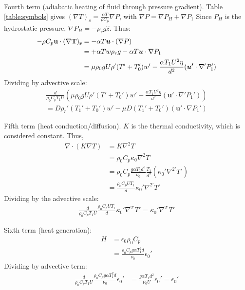 \documentclass[a4paper]{article}
\begin{document}
\begin{mdframed}
    Fourth term (adiabatic heating of fluid through pressure gradient). Table \ref{table:symbols} gives $(\nabla T)_s = \frac{\alpha T}{\rho C_p}\nabla P$, with $\nabla P = \nabla P_H + \nabla P_1$ 
    Since $P_H$ is the hydrostatic pressure, $\nabla P_H = -\rho_r g \hat{z}$. Thus: 
    \begin{align*}
        -\rho C_p \bf{u} \cdot (\nabla T)_s &= -\alpha T \bm{u} \cdot (\nabla P)\\
        &= +\alpha T w \rho_r g - \alpha T \bm{u} \cdot \nabla P_1\\
        &= \mu \rho_0gU\rho'(T'+T_0')w' - \frac{\alpha T_1 U^2 \eta}{d^2} (\bm{u'}\cdot \nabla'P_1') \\
    \end{align*} 
Dividing by advective scale: 
\begin{align*}
    \frac{d}{\rho_0C_p T_1 U} \left(\mu \rho_0gU\rho'(T'+T_0')w' - \frac{\alpha T_1 U^2 \eta}{d^2} (\bm{u'}\cdot \nabla'P_1')\right) \\
    = D \rho_r'(T_1'+T_0')w' - \mu D (T_1'+T_0')(\bm{u'}\cdot\nabla P_1') 
\end{align*}
\end{mdframed}
\begin{mdframed}
    Fifth term (heat conduction/diffusion). $K$ is the thermal conductivity, which is considered constant. Thus, 
    \begin{align*}
        \nabla \cdot (K\nabla T) &= K\nabla^2T\\
        &= \rho_0 C_p \kappa_0  \nabla^2 T\\
        &= \rho_0 C_p \frac{g\alpha T_1 d^3}{\nu_0} \frac{T_1}{d^2} (\kappa_0' \nabla^{2'}T') \\
        &= \frac{\rho_0C_pUT_1}{d}\kappa_0' \nabla^{2'}T'
    \end{align*}
    Dividing by the advective scale: 
    \begin{align*}
        \frac{d}{\rho_0C_p T_1 U} \frac{\rho_0C_pUT_1}{d}\kappa_0' \nabla^{2'}T' = \kappa_0' \nabla^{2'}T' 
    \end{align*}
\end{mdframed}

\begin{mdframed}
    Sixth term (heat generation): 
    \begin{align*}
        H &= \epsilon_0\rho_0C_p\\
        &= \frac{\rho_0C_p g \alpha T_1^2d}{\nu_0}\epsilon_0'
    \end{align*}
    Dividing by advective term: 
    \begin{align*}
        \frac{d}{\rho_0C_p T_1 U}  \frac{\rho_0C_p g \alpha T_1^2d}{\nu_0}\epsilon_0' &= \frac{g\alpha T_1 d^2 }{\nu_0 U} \epsilon_0' = \epsilon_0'
    \end{align*}
\end{mdframed}
\end{document}
